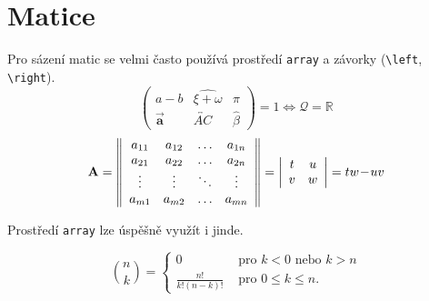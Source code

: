 \documentclass[11pt]{article}
\theoremstyle{definition}
\begin{document}
    \section{Matice}
    Pro sázení matic se velmi často používá prostředí \texttt{array} a závorky (\texttt{\textbackslash left}, \texttt{\textbackslash right}).
    \begin{equation}
        \left( \begin{array}{ccc} \nonumber
            a-b & \widehat{\xi+\omega} & \pi \\
            \vec{\mathbf{a}} & \overleftrightarrow{A C} & \hat{\beta}
        \end{array} \right) = 1 \Longleftrightarrow \mathcal{Q}=\mathbb{R}
    \end{equation}
    \begin{equation}
        \text{\textbf{A}} = \nonumber
        \left\| \begin{array}{cccc}
            a_{11}  & a_{12}  & \ldots & a_{1 n} \\
            a_{21}  & a_{22}  & \ldots & a_{2 n} \\
            \vdots  & \vdots  & \ddots & \vdots  \\
            a_{m 1} & a_{m 2} & \ldots & a_{m n}
        \end{array} \right\| =
        \left| \begin{array}{cc}
            t & u \\
            v & w
        \end{array} \right| = tw \! - \! uv
    \end{equation}
    
    Prostředí \texttt{array} lze úspěšně využít i jinde.
    
    \begin{equation*}
        \binom{n}{k} = 
        \left\{ \begin{array}{cl}
            0 & \text{ pro } k < 0 \text{ nebo } k > n \\
            \frac{n!}{k!(n - k)!} & \text{ pro } 0 \leq k \leq n.
        \end{array}\right.
    \end{equation*}
\end{document}
